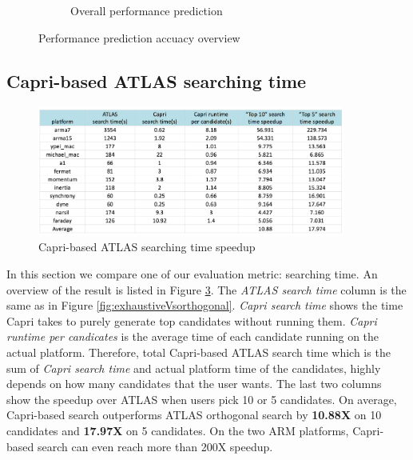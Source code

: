 \begin{figure}[bhp]
\begin{subfigure}[b]{1.0\linewidth}
      \caption{Overall performance prediction}
      \label{fig:overall_pref}
    \end{subfigure}
    \caption{Performance prediction accuacy overview}
  \end{figure}



  \subsection{Capri-based ATLAS searching time}
  \label{sec:capri_atlas_searching}
  \begin{figure}[tbhp]
    \centering
    \includegraphics[width=0.9\textwidth]{images/timespeedup.png}
    \caption{Capri-based ATLAS searching time speedup}
    \label{fig:search_time}
  \end{figure}

  In this section we compare one of our evaluation metric: searching time. An overview of the result is listed in
  Figure \ref{fig:search_time}. The \textit{ATLAS search time} column is the same as in Figure \ref{fig:exhaustiveVsorthogonal}.
  \textit{Capri search time} shows the time Capri takes to purely generate top candidates without running them.
  \textit{Capri runtime per candicates} is the average time of each candidate running on the actual platform.
  Therefore, total Capri-based ATLAS search time which is the sum of \textit{Capri search time} and actual platform time of the candidates,
  highly depends on how many candidates that the user wants. The last two columns show the speedup over ATLAS when users pick
  10 or 5 candidates. On average, Capri-based search outperforms ATLAS orthogonal search by \textbf{10.88X} on 10 candidates and \textbf{17.97X} on
  5 candidates. On the two ARM platforms, Capri-based search can even reach more than 200X speedup.


